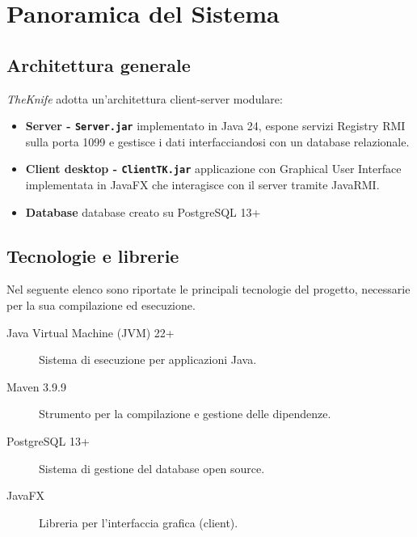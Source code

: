 \section{Panoramica del Sistema}
\label{cap:panoramica}
\subsection{Architettura generale}
\emph{TheKnife} adotta un'architettura client-server modulare:
\begin{itemize}
    \item \textbf{Server - \texttt{Server.jar}} implementato in Java 24, 
    espone servizi Registry RMI sulla porta 1099 e 
    gestisce i dati interfacciandosi con un database relazionale.
    \item \textbf{Client desktop - \texttt{ClientTK.jar}} applicazione con 
    Graphical User Interface implementata in JavaFX 
    che interagisce con il server tramite JavaRMI.
    \item \textbf{Database} database creato su PostgreSQL 13+
\end{itemize}

\subsection{Tecnologie e librerie}
Nel seguente elenco sono riportate le principali tecnologie del 
progetto, necessarie per la sua compilazione ed esecuzione.
\begin{description}
    \item[Java Virtual Machine (JVM) 22+] Sistema di esecuzione per applicazioni Java.
    \item[Maven 3.9.9] Strumento per la compilazione e gestione delle dipendenze.
    \item[PostgreSQL 13+] Sistema di gestione del database open source.
    \item[JavaFX] Libreria per l'interfaccia grafica (client).
\end{description}
